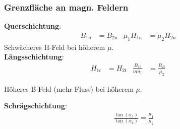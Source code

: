 \subsubsection{Grenzfläche an magn. Feldern}
\textbf{Querschichtung}:
\begin{align*}
	B_{1n} & = B_{2n} & \mu_1 H_{1n} & =\mu_2 H_{2n} &
\end{align*}
Schwächeres H-Feld bei höherem $ \mu $.\\

\textbf{Längsschichtung}:
\begin{align*}
	H_{1t} & = H_{2t} & \frac{B_{1t}}{mu_1} & = \frac{B_{2t}}{\mu_2} &
\end{align*}

Höheres B-Feld (mehr Fluss) bei höherem $ \mu $.

\vspace{0.5em}
\textbf{Schrägschichtung}:
\begin{align*}
	 & \frac{\tan( \alpha_1)}{\tan( \alpha_2)} = \frac{ \mu_1}{\mu_2}
\end{align*}
